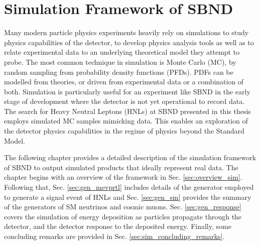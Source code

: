 
\chapter{Simulation Framework of SBND}
\label{ChapterSim}

\ifpdf
    \graphicspath{{Chapter5/Figs/Raster/}{Chapter5/Figs/PDF/}{Chapter5/Figs/}}
\else
    \graphicspath{{Chapter5/Figs/Vector/}{Chapter5/Figs/}}
\fi


Many modern particle physics experiments heavily rely on simulations to study physics capabilities of the detector, to develop physics analysis tools as well as to relate experimental data to an underlying theoretical model they attempt to probe.
The most common technique in simulation is Monte Carlo (MC), by random sampling from probability density functions (PFDs).
PDFs can be modelled from theories, or driven from experimental data or a combination of both.
Simulation is particularly useful for an experiment like SBND in the early stage of development where the detector is not yet operational to record data.
The search for Heavy Neutral Leptons (HNLs) at SBND presented in this thesis employs simulated MC samples mimicking data. 
This enables an exploration of the detector physics capabilities in the regime of physics beyond the Standard Model.

The following chapter provides a detailed description of the simulation framework of SBND to output simulated products that ideally represent real data.
The chapter begins with an overview of the framework in Sec. \ref{sec:overview_sim}.
Following that, Sec. \ref{sec:gen_mevprtl} includes details of the generator employed to generate a signal event of HNLs and Sec. \ref{sec:gen_sm} provides the summary of the generators of SM neutrinos and cosmic muons.
Sec. \ref{sec:gen_response} covers the simulation of energy deposition as particles propagate through the detector, and the detector response to the deposited energy.
Finally, some concluding remarks are provided in Sec. \ref{sec:sim_concluding_remarks}.

